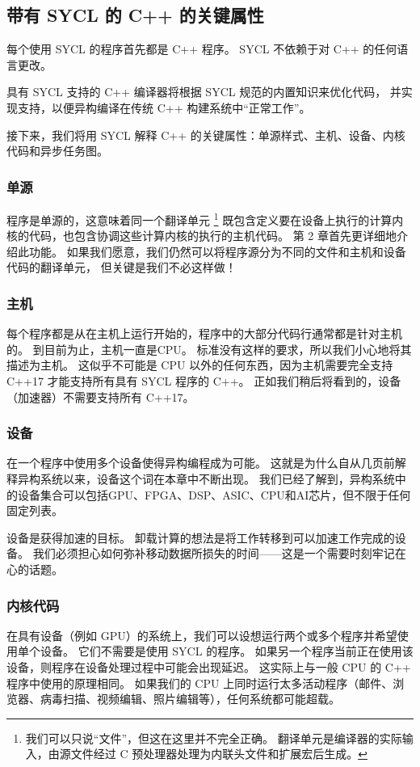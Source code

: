 \subsection{带有 SYCL 的 C++ 的关键属性}
每个使用 SYCL 的程序首先都是 C++ 程序。 SYCL 不依赖于对 C++ 的任何语言更改。

具有 SYCL 支持的 C++ 编译器将根据 SYCL 规范的内置知识来优化代码，
并实现支持，以便异构编译在传统 C++ 构建系统中“正常工作”。

接下来，我们将用 SYCL 解释 C++ 的关键属性：单源样式、主机、设备、内核代码和异步任务图。

\subsubsection{单源}
程序是单源的，这意味着同一个翻译单元 \footnote{我们可以只说“文件”，但这在这里并不完全正确。 
翻译单元是编译器的实际输入，由源文件经过 C 预处理器处理为内联头文件和扩展宏后生成。} 
既包含定义要在设备上执行的计算内核的代码，也包含协调这些计算内核的执行的主机代码。 
第 2 章首先更详细地介绍此功能。 如果我们愿意，我们仍然可以将程序源分为不同的文件和主机和设备代码的翻译单元，
但关键是我们不必这样做！

\subsubsection{主机}
每个程序都是从在主机上运行开始的，程序中的大部分代码行通常都是针对主机的。 
到目前为止，主机一直是CPU。 标准没有这样的要求，所以我们小心地将其描述为主机。 
这似乎不可能是 CPU 以外的任何东西，因为主机需要完全支持 C++17 才能支持所有具有 SYCL 程序的 C++。 
正如我们稍后将看到的，设备（加速器）不需要支持所有 C++17。

\subsubsection{设备}
在一个程序中使用多个设备使得异构编程成为可能。 这就是为什么自从几页前解释异构系统以来，设备这个词在本章中不断出现。 
我们已经了解到，异构系统中的设备集合可以包括GPU、FPGA、DSP、ASIC、CPU和AI芯片，但不限于任何固定列表。

设备是获得加速的目标。 卸载计算的想法是将工作转移到可以加速工作完成的设备。 
我们必须担心如何弥补移动数据所损失的时间——这是一个需要时刻牢记在心的话题。

\subsubsection{内核代码}
在具有设备（例如 GPU）的系统上，我们可以设想运行两个或多个程序并希望使用单个设备。 
它们不需要是使用 SYCL 的程序。 如果另一个程序当前正在使用该设备，则程序在设备处理过程中可能会出现延迟。 
这实际上与一般 CPU 的 C++ 程序中使用的原理相同。 
如果我们的 CPU 上同时运行太多活动程序（邮件、浏览器、病毒扫描、视频编辑、照片编辑等），任何系统都可能超载。

